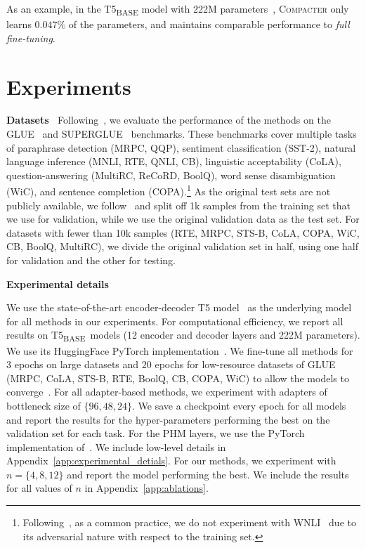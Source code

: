  As an example, in the T5\textsubscript{\tiny BASE} model with 222M parameters~\citep{raffel2019exploring}, \textsc{Compacter} only learns $0.047\%$ of the parameters, and maintains comparable performance to \emph{full fine-tuning}.

\section{Experiments} \label{sec:experiments}
 \textbf{Datasets} $\:$ Following~\citet{raffel2019exploring}, we evaluate the performance of the methods on the GLUE~\citep{wang2018glue} and SUPERGLUE~\citep{wang2019superglue} benchmarks. These benchmarks cover multiple tasks of paraphrase detection (MRPC, QQP), sentiment classification (SST-2), natural language inference (MNLI, RTE, QNLI, CB), linguistic acceptability (CoLA), question-answering (MultiRC, ReCoRD, BoolQ), word sense disambiguation (WiC), and sentence completion (COPA).\footnote{
Following~\citet{raffel2019exploring, devlin2019bert}, as a common practice, we do not experiment with WNLI~\citep{levesque2012winograd} due to its adversarial nature with respect to the training set.} As the original test sets are not publicly available, we follow~\citet{zhang2020revisiting} and split off 1k samples from the training set that we use for validation, while we use the original validation data as the test set. For datasets with fewer than 10k samples (RTE, MRPC, STS-B, CoLA, COPA, WiC, CB, BoolQ, MultiRC),  we divide the original validation set in half, using one half for validation and the other for testing.

 \textbf{Experimental details} $\:$  

We use the state-of-the-art encoder-decoder T5 model~\citep{raffel2019exploring} as the underlying model for all methods in our experiments. For computational efficiency, we report all results on T5\textsubscript{\tiny BASE}~models (12 encoder and decoder layers and 222M parameters). We use its HuggingFace PyTorch implementation~\citep{wolf-etal2020transformers}. We fine-tune all methods for 3 epochs on large datasets and 20 epochs for low-resource datasets of \textsc{GLUE} (MRPC, CoLA, STS-B, RTE, BoolQ, CB, COPA, WiC) to allow the models to converge~\citep{zhang2020revisiting}. For all adapter-based methods, we experiment with adapters of bottleneck size of $\{96, 48, 24\}$. We save a checkpoint every epoch for all models and report the results for the hyper-parameters performing the best on the validation set for each task. For the PHM layers, we use the PyTorch implementation of~\citet{le2021parameterized}. We include low-level details in Appendix~\ref{app:experimental_detials}. For our methods, we experiment with $n=\{4, 8, 12\}$ and report the model performing the best. We include the results for all values of $n$ in Appendix~\ref{app:ablations}.

